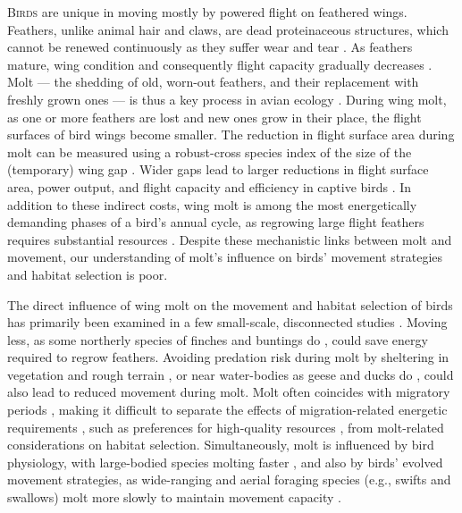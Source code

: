 
\begin{refsection}

\newrefcontext[sorting=ynt]

\lettrine{B}{irds} are unique in moving mostly by powered flight on feathered wings.
Feathers, unlike animal hair and claws, are dead proteinaceous structures, which cannot be renewed continuously as they suffer wear and tear \cite{rayner1988,jenni1989}.
As feathers mature, wing condition and consequently flight capacity gradually decreases \cite{lindstrom1994,hedenstrom1999,hedenstrom2003}.
Molt --- the shedding of old, worn-out feathers, and their replacement with freshly grown ones --- is thus a key process in avian ecology \cite{ginn1983,rayner1988}.
During wing molt, as one or more feathers are lost and new ones grow in their place, the flight surfaces of bird wings become smaller.
The reduction in flight surface area during molt can be measured using a robust-cross species index of the size of the (temporary) wing gap \citep{lind2001,kiat2016}.
Wider gaps lead to larger reductions in flight surface area, power output, and flight capacity and efficiency in captive birds \cite{tucker1991,swaddle1996,swaddle1997,williams2003,lind2001,lind2001a,bowlin2009}.
In addition to these indirect costs, wing molt is among the most energetically demanding phases of a bird's annual cycle, as regrowing large flight feathers requires substantial resources \cite{lindstrom1993,newton2009,kiat2017}.
Despite these mechanistic links between molt and movement, our understanding of molt's influence on birds' movement strategies and habitat selection is poor.

The direct influence of wing molt on the movement and habitat selection of birds has primarily been examined in a few small-scale, disconnected studies \citep{bell1970,haukioja1971,green1975,francis1991,madsen1987a,fox1998}.
Moving less, as some northerly species of finches and buntings do \citep{bell1970,haukioja1971,green1975,francis1991}, could save energy required to regrow feathers.
Avoiding predation risk during molt by sheltering in vegetation and rough terrain \citep{bell1970,haukioja1971,green1975,francis1991}, or near water-bodies as geese and ducks do \cite{madsen1987a,fox1998}, could also lead to reduced movement during molt.
Molt often coincides with migratory periods \citep{kiat2019}, making it difficult to separate the effects of migration-related energetic requirements \cite{alerstam1990,wikelski2003,horvitz2014}, such as preferences for high-quality resources \cite{madsen1987a,fox1998}, from molt-related considerations on habitat selection.
Simultaneously, molt is influenced by bird physiology, with large-bodied species molting faster \citep{kiat2021,jenni2020}, and also by birds' evolved movement strategies, as wide-ranging and aerial foraging species (e.g., swifts and swallows) molt more slowly to maintain movement capacity \cite{kiat2016}.


\end{refsection}

